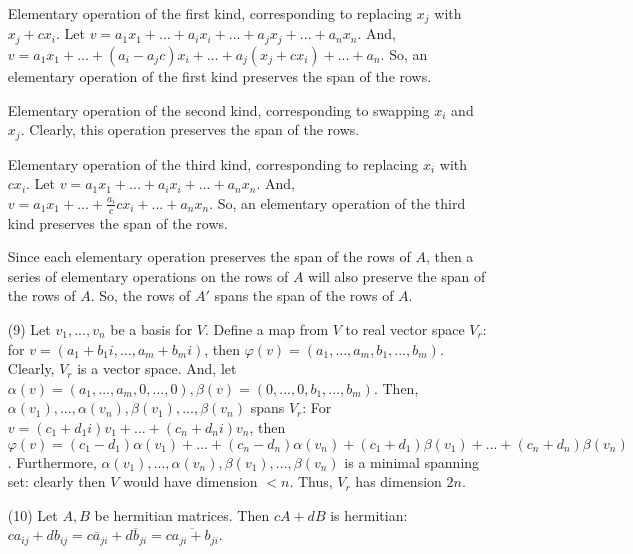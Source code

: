 \documentclass[12pt]{article}
\begin{document}
\begin{itemize}
Elementary operation of the first kind, corresponding to replacing $x_j$ with $x_j + cx_i$. Let $v = a_1x_1 + ... + a_ix_i + ... + a_jx_j + ... + a_nx_n$. And, $v = a_1x_1 + ... + (a_i - a_jc)x_i + ... + a_j(x_j + cx_i) + ... + a_n$.  So, an elementary operation of the first kind preserves the span of the rows.

Elementary operation of the second kind, corresponding to swapping $x_i$ and $x_j$. Clearly, this operation preserves the span of the rows.

Elementary operation of the third kind, corresponding to replacing $x_i$ with $cx_i$. Let $v = a_1x_1 + ... + a_ix_i + ... + a_nx_n$. And, $v = a_1x_1 + ... + \frac{a_i}{c}cx_i + ... + a_nx_n$. So, an elementary operation of the third kind preserves the span of the rows.

Since each elementary operation preserves the span of the rows of $A$, then a series of elementary operations on the rows of $A$ will also preserve the span of the rows of $A$. So, the rows of $A'$ spans the span of the rows of $A$.
\item[(9)]
Let $v_1, ..., v_n$ be a basis for $V$. Define a map from $V$ to real vector space $V_r$: for $v = (a_1 + b_1i, ..., a_m + b_mi)$, then $\varphi(v) = (a_1, ..., a_m, b_1, ..., b_m)$. Clearly, $V_r$ is a vector space. And, let $\alpha(v) = (a_1, ..., a_m, 0, ..., 0), \beta(v) = (0, ..., 0, b_1, ..., b_m)$. Then, $\alpha(v_1), ..., \alpha(v_n), \beta(v_1), ..., \beta(v_n)$ spans $V_r$: For $v = (c_1 + d_1i)v_1 + ... + (c_n + d_ni)v_n$, then $\varphi(v) = (c_1 - d_1)\alpha(v_1) + ... + (c_n - d_n)\alpha(v_n) + (c_1 + d_1)\beta(v_1) + ... + (c_n + d_n)\beta(v_n)$. Furthermore, $\alpha(v_1), ..., \alpha(v_n), \beta(v_1), ..., \beta(v_n)$ is a minimal spanning set: clearly then $V$ would have dimension $< n$. Thus, $V_r$ has dimension $2n$.
\item[(10)]
Let $A, B$ be hermitian matrices. Then $cA + dB$ is hermitian: $ca_{ij} + db_{ij} = c\overline{a}_{ji} + d\overline{b}_{ji} = \overline{ca_{ji} + b_{ji}}$.


\end{itemize}
\end{document}
